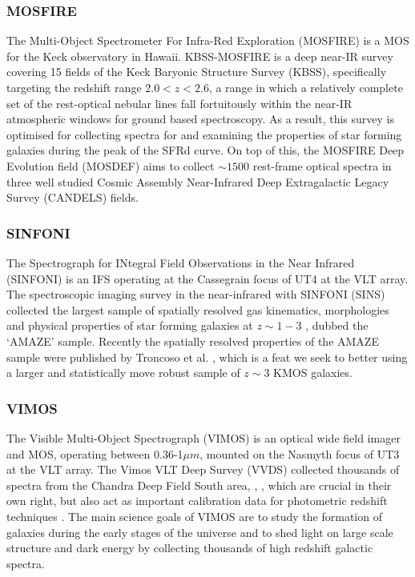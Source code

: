 \documentclass{literature}
\begin{document}
\subsubsection{MOSFIRE}\label{subsubsec:MOSFIRE}
The Multi-Object Spectrometer For Infra-Red Exploration (MOSFIRE) \citep{McLean2012} is a MOS for the Keck observatory in Hawaii. KBSS-MOSFIRE is a deep near-IR survey covering 15 fields of the Keck Baryonic Structure Survey (KBSS), specifically targeting the redshift range $2.0 < z < 2.6$, a range in which a relatively complete set of the rest-optical nebular lines fall fortuitously within the near-IR atmospheric windows for ground based spectroscopy. As a result, this survey is optimised for collecting spectra for and examining the properties of star forming galaxies during the peak of the SFRd curve. On top of this, the MOSFIRE Deep Evolution field (MOSDEF) \citep{Kriek2014}  aims to collect $\sim 1500$ rest-frame optical spectra in three well studied Cosmic Assembly Near-Infrared Deep Extragalactic Legacy Survey (CANDELS) \citep{Grogin2011} fields.

\subsubsection{SINFONI}\label{subsubsec:SINFONI}
The Spectrograph for INtegral Field Observations in the Near Infrared (SINFONI) \citep{Eisenhauer2003} is an IFS operating at the Cassegrain focus of UT4 at the VLT array. The spectroscopic imaging survey in the near-infrared with SINFONI (SINS) collected the largest sample of spatially resolved gas kinematics, morphologies and physical properties of star forming galaxies at $z \sim 1-3$ \citep{ForsterSchreiber2009}, dubbed the `AMAZE' sample. Recently the spatially resolved properties of the AMAZE sample were published by Troncoso et al. \citep{Troncoso_2014}, which is a feat we seek to better using a larger and statistically move robust sample of $z \sim 3$ KMOS galaxies.

\subsubsection{VIMOS}\label{subsubsec:VIMOS}
The Visible Multi-Object Spectrograph (VIMOS) \citep{LeFevre2003} is an optical wide field imager and MOS, operating between 0.36-1$\mu m$, mounted on the Nasmyth focus of UT3 at the VLT array. The Vimos VLT Deep Survey (VVDS) collected thousands of spectra from the Chandra Deep Field South area, \citep{LeFvre2004}, \citep{LeFevre2005}, which are crucial in their own right, but also act as important calibration data for photometric redshift techniques \citep{Ilbert2006}. The main science goals of VIMOS are to study the formation of galaxies during the early stages of the universe and to shed light on large scale structure and dark energy by collecting thousands of high redshift galactic spectra. 
\end{document}
